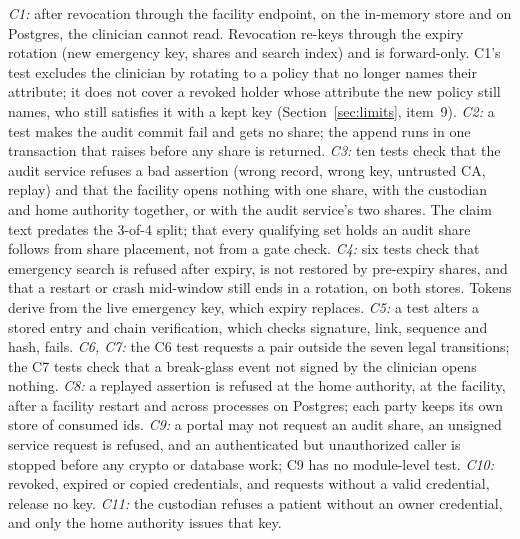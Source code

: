 \emph{C1:} after revocation through the facility endpoint, on the in-memory
store and on Postgres, the clinician cannot read.
Revocation re-keys through the expiry rotation (new emergency key, shares and
search index) and is forward-only.
C1's test excludes the clinician by rotating to a policy that no longer
names their attribute; it does not cover a revoked holder whose attribute
the new policy still names, who still satisfies it with a kept key
(Section~\ref{sec:limits}, item~9).
\emph{C2:} a test makes the audit commit fail
and gets no share; the append runs in one transaction that raises before any
share is returned.
\emph{C3:} ten tests check that the audit service refuses a bad assertion
(wrong record, wrong key, untrusted CA, replay) and that the facility opens
nothing with one share, with the custodian and home authority together, or
with the audit service's two shares.
The claim text predates the 3-of-4 split; that every
qualifying set holds an audit share follows from share placement, not from a
gate check.
\emph{C4:} six tests check that emergency search is refused after expiry, is
not restored by pre-expiry shares, and that a restart or crash mid-window
still ends in a rotation, on both stores.
Tokens derive from the live emergency key, which expiry replaces.
\emph{C5:} a test alters a stored entry and chain
verification, which checks signature, link, sequence and hash, fails.
\emph{C6, C7:} the C6 test requests a pair outside the seven legal
transitions; the C7 tests check that a break-glass event not signed by the
clinician opens nothing.
\emph{C8:} a replayed assertion is refused at the home authority, at the
facility, after a facility restart and across processes on Postgres; each
party keeps its own store of consumed ids.
\emph{C9:} a portal may not request an audit share, an unsigned service
request is refused, and an authenticated but unauthorized caller is stopped
before any crypto or database work; C9 has no module-level test.
\emph{C10:} revoked, expired or copied credentials, and requests without a
valid credential, release no key.
\emph{C11:} the custodian refuses a patient without an owner credential, and
only the home authority issues that key.

